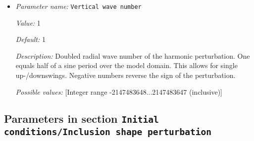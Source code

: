 \begin{itemize}
{\it Description:} The reference temperature that is perturbed by theharmonic function. Only used in incompressible models.


{\it Possible values:} [Double 0...1.79769e+308 (inclusive)]
\item {\it Parameter name:} {\tt Vertical wave number}


{\it Value:} 1


{\it Default:} 1


{\it Description:} Doubled radial wave number of the harmonic perturbation.  One equals half of a sine period over the model domain.  This allows for single up-/downswings. Negative numbers  reverse the sign of the perturbation.


{\it Possible values:} [Integer range -2147483648...2147483647 (inclusive)]
\end{itemize}

\subsection{Parameters in section \tt Initial conditions/Inclusion shape perturbation}
\label{parameters:Initial_20conditions/Inclusion_20shape_20perturbation}

